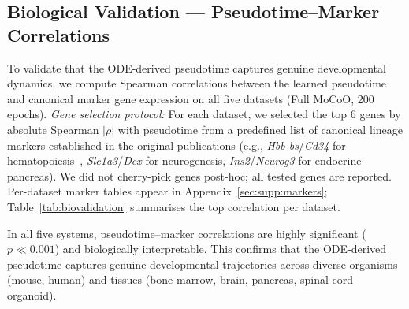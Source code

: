 \documentclass[preprint,12pt,number]{elsarticle}
\begin{document}
\subsection{Biological Validation --- Pseudotime--Marker Correlations}
\label{sec:results:bio}

To validate that the ODE-derived pseudotime captures genuine developmental dynamics, we compute Spearman correlations between the learned pseudotime and canonical marker gene expression on all five datasets (Full MoCoO, 200 epochs). \textit{Gene selection protocol:} For each dataset, we selected the top 6 genes by absolute Spearman $|\rho|$ with pseudotime from a predefined list of canonical lineage markers established in the original publications (e.g., \textit{Hbb-bs}/\textit{Cd34} for hematopoiesis~\cite{paul2015transcriptional}, \textit{Slc1a3}/\textit{Dcx} for neurogenesis, \textit{Ins2}/\textit{Neurog3} for endocrine pancreas). We did not cherry-pick genes post-hoc; all tested genes are reported. Per-dataset marker tables appear in Appendix~\ref{sec:supp:markers}; Table~\ref{tab:biovalidation} summarises the top correlation per dataset.

\begin{table}[!t]
    \centering
    \caption{Biovalidation summary across all five datasets (Full MoCoO, 200 epochs).}
    \label{tab:biovalidation}
\end{table}

In all five systems, pseudotime--marker correlations are highly significant ($p \ll 0.001$) and biologically interpretable. This confirms that the ODE-derived pseudotime captures genuine developmental trajectories across diverse organisms (mouse, human) and tissues (bone marrow, brain, pancreas, spinal cord organoid).
\end{document}
